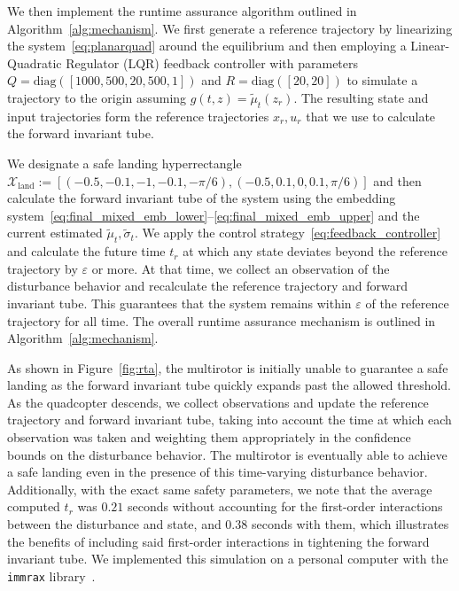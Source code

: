 \documentclass{IEEEojcsys}
\begin{document}
We then implement the runtime assurance algorithm outlined in Algorithm~\ref{alg:mechanism}. We first generate a reference trajectory by linearizing the system~\eqref{eq:planarquad} around the equilibrium and then employing a Linear-Quadratic Regulator (LQR) feedback controller with parameters
$Q = \text{diag}([1000, 500, 20, 500, 1])$ and $R = \text{diag}([20, 20])$ to simulate a trajectory to the origin assuming $g(t, z) = \widetilde{\mu}_t(z_r)$. The resulting state and input trajectories form the reference trajectories $x_r, u_r$ that we use to calculate the forward invariant tube.

We designate a safe landing hyperrectangle $\mathcal{X}_\text{land} := [(-0.5, -0.1, -1, -0.1, -\pi/6), (-0.5, 0.1, 0, 0.1, \pi/6)]$ and then calculate the forward invariant tube of the system using the embedding system~\eqref{eq:final_mixed_emb_lower}--\eqref{eq:final_mixed_emb_upper} and the current estimated $\widetilde{\mu}_t, \widetilde{\sigma}_t$. We apply the control strategy~\eqref{eq:feedback_controller} and calculate the future time $t_r$ at which any state deviates beyond the reference trajectory by $\varepsilon$ or more. At that time, we collect an observation of the disturbance behavior and recalculate the reference trajectory and forward invariant tube. This guarantees that the system remains within $\varepsilon$ of the reference trajectory for all time. The overall runtime assurance mechanism is outlined in Algorithm~\ref{alg:mechanism}.





As shown in Figure~\ref{fig:rta}, the multirotor is initially unable to guarantee a safe landing as the forward invariant tube quickly expands past the allowed threshold. As the quadcopter descends, we collect observations and update the reference trajectory and forward invariant tube, taking into account the time at which each observation was taken and weighting them appropriately in the confidence bounds on the disturbance behavior. The multirotor is eventually able to achieve a safe landing even in the presence of this time-varying disturbance behavior. Additionally, with the exact same safety parameters, we note that the average computed $t_r$ was $0.21$ seconds without accounting for the first-order interactions between the disturbance and state, and $0.38$ seconds with them, which illustrates the benefits of including said first-order interactions in tightening the forward invariant tube.
We implemented this simulation on a personal computer with the \texttt{immrax} library~\cite{immrax}. 
\end{document}
